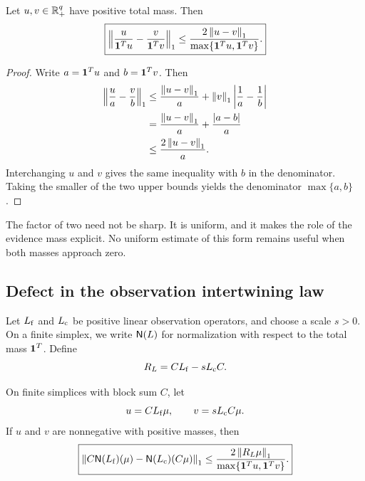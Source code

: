 \begin{PRIQlemma}\label{PRIQ:lem:normalization-perturbation}
Let $u,v\in\mathbb R_+^q$ have positive total mass.  Then
\begin{equation}\label{PRIQ:eq:normalization-perturbation}
  \boxed{
  \left\lVert 
  \frac{u}{\mathbf 1^Tu}
  -
  \frac{v}{\mathbf 1^Tv}
  \right\rVert_1
  \leq
  \frac{2\left\lVert u-v\right\rVert_1}
  {\max\{\mathbf 1^Tu,\mathbf 1^Tv\}}.}
\end{equation}
\end{PRIQlemma}

\begin{proof}
Write $a=\mathbf 1^Tu$ and $b=\mathbf 1^Tv$.  Then
\begin{align*}
\left\lVert \frac{u}{a}-\frac{v}{b}\right\rVert_1
&\leq
\frac{\left\lVert u-v\right\rVert_1}{a}
+
\left\lVert v\right\rVert_1\left\lvert \frac1a-\frac1b\right\rvert\\
&=
\frac{\left\lVert u-v\right\rVert_1}{a}
+
\frac{\left\lvert a-b\right\rvert}{a}\\
&\leq
\frac{2\left\lVert u-v\right\rVert_1}{a}.
\end{align*}
Interchanging $u$ and $v$ gives the same inequality with $b$ in the denominator.  Taking the smaller of the two upper bounds yields the denominator $\max\{a,b\}$.
\end{proof}

The factor of two need not be sharp.  It is uniform, and it makes the role of the evidence mass explicit.  No uniform estimate of this form remains useful when both masses approach zero.

\subsection{Defect in the observation intertwining law}
Let $L_{\mathrm f}$ and $L_{\mathrm c}$ be positive linear observation operators, and choose a scale $s>0$.  On a finite simplex, we write $\mathsf N(L)$ for normalization with respect to the total mass $\mathbf 1^T$.  Define
\begin{equation}\label{PRIQ:eq:observation-linear-defect}
  R_L
  =
  CL_{\mathrm f}-sL_{\mathrm c}C.
\end{equation}

\begin{PRIQtheorem}\label{PRIQ:thm:approx-normalized-transfer}
On finite simplices with block sum $C$, let
\[
  u=CL_{\mathrm f}\mu,
  \qquad
  v=sL_{\mathrm c}C\mu.
\]
If $u$ and $v$ are nonnegative with positive masses, then
\begin{equation}\label{PRIQ:eq:approx-normalized-transfer}
  \boxed{
  \left\lVert 
  C\mathsf N(L_{\mathrm f})(\mu)
  -
  \mathsf N(L_{\mathrm c})(C\mu)
  \right\rVert_1
  \leq
  \frac{2\left\lVert R_L\mu\right\rVert_1}
  {\max\{\mathbf 1^Tu,\mathbf 1^Tv\}}.}
\end{equation}
\end{PRIQtheorem}

